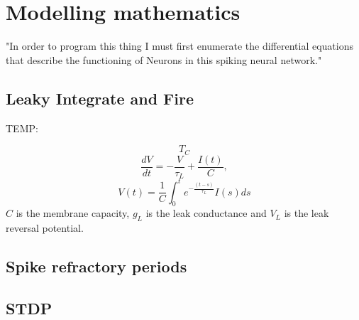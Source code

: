 \section{Modelling mathematics}
"In order to program this thing I must first enumerate the differential equations
that describe the functioning of Neurons in this spiking neural network."
\subsection{Leaky Integrate and Fire}

TEMP:
\begin{figure*}[h]
    \centering
    \begin{equation}\label{eq:LIF_TC}
        T_C
    \end{equation}
    \begin{equation}\label{eq:LIF_RC}
        \frac{d V}{d t} = -\frac{V}{\tau_L} + \frac{I(t)}{C},
    \end{equation}
    \begin{equation}\label{eq:integ_LIF_RC_VL}
        V(t)= \frac{1}{C} \int_{0}^{t} e^{-\frac{(t-s)}{\tau_L}} I(s) ds
    \end{equation}
    $C$ is the membrane capacity, $g_L$ is the leak conductance and $V_L$ is the leak reversal potential.
    \label{LIFequation}
\end{figure*}

\subsection{Spike refractory periods}

\subsection{STDP}